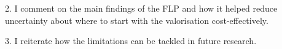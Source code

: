 2. I comment on the main findings of the FLP and how it helped reduce uncertainty about where to start with the valorisation cost-effectively.

3. I reiterate how the limitations can be tackled in future research.

\begin{comment}


\section{Supply Chain Management Optimisation}

The use of agricultural waste in valorisation processes requires investment in processing plants and costs in transportation. It also generates GHG emissions determined by the valorisation option process (e.g. biogas plant or fibre extraction), the distance and mode of transportation, the extraction, the storage, and the manufacturing of machinery. On the other hand, as the current management of pineapple stubble requires the use of agrochemicals, its valorisation can also reduce GHG emissions as it would eliminate the need to manage the stubble in the field. 

As the PAL is a residue produced by the the pineapple production, its production does not compete with other crops or land uses. Thus, the optimisation of its supply chain is purely based on the minimisation of costs and GHG emissions. The total cost of a potential PAL supply chain is composed of capital costs of the valorisation plant, operation costs of the valorisation process, and PAL costs. The latter is composed of extraction, transportation, and storage.

The PAL costs depend on the spatial conditions such as the availability of 
PAL and the road network for transportation.  The optimisation of the PAL supply chain can be seen as the analysis of the spatial distribution and amount of potential PAL for different valorisation options and the optimal locations, sizes and number of processing plants. Thus, a GIS-based approach is proposed  as it  can assist in the location selection process. 


\section{Primary and Secondary Data Collection}

Data collection from academic and grey literature, interviews, and observations will be conducted to document   the PAL valorisation options being considered in CR. It is expected to identify the (potential) demand and price of PAL by-products and determine the regulations that may affect the valorisation options.

\end{comment}